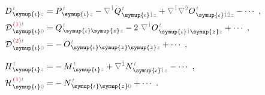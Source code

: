 \begin{subequations} \label{eq:DH^(2-0)_0=}
\begin{align}
	D^{\;\!\mathcolor{gray}{t}}_{\;\! \symup{\iota}\mathcolor{gray}{z}} &= P^{\;\!\mathcolor{gray}{t}}_{\;\! \symup{\iota}\mathcolor{gray}{z}} - \mathcolor{gray}{\nabla^{\hat{1}}} Q^{\;\!\mathcolor{gray}{t}}_{\;\! \symup{\iota} \mathcolor{gray}{\hat{1}} \mathcolor{gray}{z}} + \mathcolor{gray}{\nabla^{\hat{1}}} \mathcolor{gray}{\nabla^{\hat{2}}} O^{\;\!\mathcolor{gray}{t}}_{\;\! \symup{\iota} \mathcolor{gray}{\hat{1}\hat{2}} \mathcolor{gray}{z}} - \cdots~, \label{eq:D^(0)=} \\
	{\mathcal{D}}^{\;\!\textcolor{Maroon}{(1)}\mathcolor{gray}{t}}_{\;\! \symup{\iota}\mathcolor{gray}{0}} &= Q^{\;\!\mathcolor{gray}{t}}_{\;\! \symup{\iota}\symup{z}\mathcolor{gray}{z}} - 2~ \mathcolor{gray}{\nabla^{\hat{1}}} O^{\;\!\mathcolor{gray}{t}}_{\;\! \symup{\iota} \mathcolor{gray}{\hat{1}} \symup{z}\mathcolor{gray}{z}} + \cdots~, \label{eq:D^(1)_0=} \\
	{\mathcal{D}}^{\;\!\textcolor{Maroon}{(2)}\mathcolor{gray}{t}}_{\;\! \symup{\iota}\mathcolor{gray}{0}} &= -\hspace{0.2em} O^{\;\!\mathcolor{gray}{t}}_{\;\! \symup{\iota}\symup{z}\symup{z}\mathcolor{gray}{z}} + \cdots~, \label{eq:D^(2)_0=} \\[0.7em]
	H^{\;\!\mathcolor{gray}{t}}_{\;\! \symup{\iota}\mathcolor{gray}{z}} &= -\hspace{0.2em} M^{\;\!\mathcolor{gray}{t}}_{\;\! \symup{\iota} \mathcolor{gray}{z}} + \mathcolor{gray}{\nabla^{\hat{1}}} N^{\;\!\mathcolor{gray}{t}}_{\;\! \symup{\iota} \mathcolor{gray}{\hat{1}} \mathcolor{gray}{z}} - \cdots~, \label{eq:H^(0)=} \\
	{\mathcal{H}}^{\;\!\textcolor{Maroon}{(1)}\mathcolor{gray}{t}}_{\;\! \symup{\iota}\mathcolor{gray}{0}} &= -\hspace{0.2em} N^{\;\!\mathcolor{gray}{t}}_{\;\! \symup{\iota}\symup{z}\mathcolor{gray}{0}} + \cdots~. \label{eq:H^(1)_0=}
\end{align}
\end{subequations}

